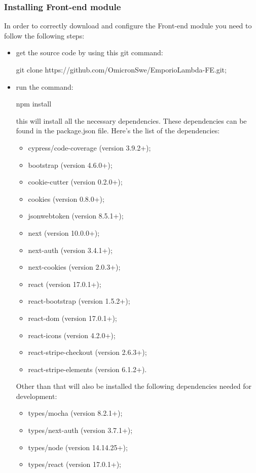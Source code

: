 \subsubsection{Installing Front-end module}
In order to correctly download and configure the Front-end module you need to follow the following steps:
\begin{itemize}
\item get the source code by using this git command:\begin{center}git clone https://github.com/OmicronSwe/EmporioLambda-FE.git;\end{center}
\item run the command:\begin{center}npm install\end{center}this will install all the necessary dependencies. These dependencies can be found in the package.json file.\newline{} Here's the list of the dependencies:
\begin{itemize}
\item cypress/code-coverage (version 3.9.2+);
\item bootstrap (version 4.6.0+);
\item cookie-cutter (version 0.2.0+);
\item cookies (version 0.8.0+);
\item jsonwebtoken (version 8.5.1+);
\item next (version 10.0.0+);
\item next-auth (version 3.4.1+);
\item next-cookies (version 2.0.3+);
\item react (version 17.0.1+);
\item react-bootstrap (version 1.5.2+);
\item react-dom (version 17.0.1+);
\item react-icons (version 4.2.0+);
\item react-stripe-checkout (version 2.6.3+);
\item react-stripe-elements (version 6.1.2+).
\end{itemize}
Other than that will also be installed the following dependencies needed for development:
\begin{itemize}
\item types/mocha (version 8.2.1+);
\item types/next-auth (version 3.7.1+);
\item types/node (version 14.14.25+);
\item types/react (version 17.0.1+);

\end{itemize}
\end{itemize}
